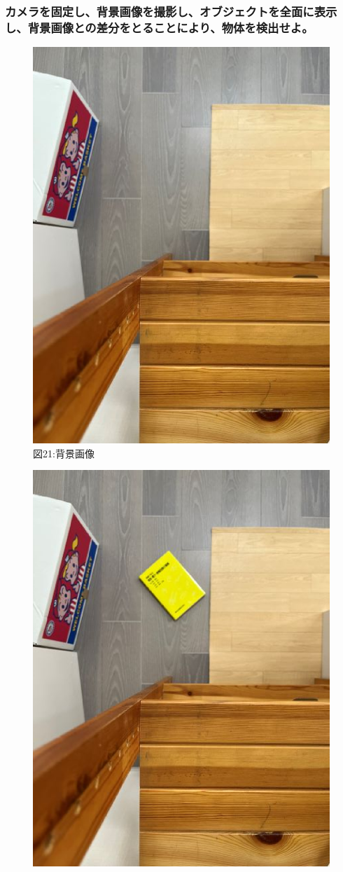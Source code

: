 ﻿\documentclass[a4j,11pt]{jarticle}
\begin{document}
\subsubsection{カメラを固定し、背景画像を撮影し、オブジェクトを全面に表示し、背景画像との差分をとることにより、物体を検出せよ。}
\clearpage
\begin{figure}[tb]

\center
 \includegraphics[width=0.7\hsize]{./eps/no_exist.eps}
 \\図21:背景画像
 \label{fig:affine1}
 \clearpage
 \begin{minipage}{0.49\hsize} %
   \center
   \includegraphics[width=0.7\hsize]{./eps/exist.eps}

\end{minipage}
\end{figure}
\end{document}
